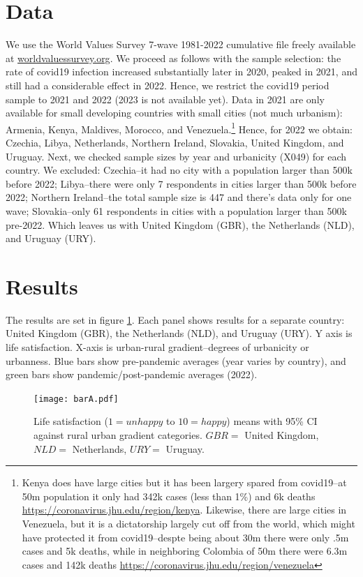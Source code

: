 \documentclass[10pt, letterpaper]{article}
\begin{document}
\begin{spacing}{1.4}
\section{Data}

We use the World Values Survey 7-wave 1981-2022 cumulative file freely available
at \url{worldvaluessurvey.org}. We
proceed as follows with the sample selection: the rate of covid19 infection
increased substantially later in 2020, peaked in 2021, and still had a
considerable effect in 2022. Hence, we restrict the covid19 period sample to
2021 and 2022 (2023 is not available yet). Data in
2021 are only available for small developing countries with small
cities (not much urbanism): Armenia, Kenya, Maldives, Morocco, and
Venezuela.\footnote{Kenya does have large cities but it has been
  largery spared from covid19--at 50m population it only had 342k cases (less
  than 1\%) and 6k deaths \url{https://coronavirus.jhu.edu/region/kenya}.  
  Likewise, there are large cities in Venezuela, but it is a dictatorship
  largely cut off from the world, which might have protected it from
  covid19--despte being about 30m there were only .5m cases and 5k deaths, while
  in neighboring Colombia of 50m there were 6.3m cases and 142k deaths
  \url{https://coronavirus.jhu.edu/region/venezuela}} Hence, for 2022 we obtain:
Czechia, Libya, Netherlands, Northern Ireland, Slovakia, United Kingdom, and Uruguay. Next, we checked sample sizes by year and urbanicity (X049) for each country. We
excluded: Czechia--it had no city with a population larger than 500k before
2022; Libya--there were only 7 respondents in cities larger than 500k before
2022; Northern Ireland--the total sample size is 447 and there's data only for
one wave; Slovakia--only 61 respondents in cities with a population larger than
500k pre-2022. Which leaves us with United Kingdom (GBR), the Netherlands (NLD), and
Uruguay (URY).


\section{Results}

The results are set in figure \ref{barA}. Each panel shows results for a
separate country: United Kingdom (GBR), the Netherlands (NLD), and Uruguay
(URY). Y axis is life satisfaction. X-axis is urban-rural gradient--degrees of
urbanicity or urbanness. Blue bars show pre-pandemic averages (year varies by country), and green bars show pandemic/post-pandemic averages (2022). 

\begin{figure}[H]
 \texttt{[image: barA.pdf]}\centering
\caption{\label{barA}Life satisfaction ($1=unhappy$ to $10=happy$) means with 95\% CI against rural urban gradient categories. $GBR=$ United Kingdom, $NLD=$ Netherlands, $URY=$ Uruguay.}
 \end{figure}


\end{spacing}
\end{document}
